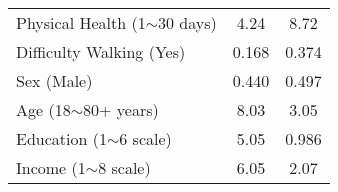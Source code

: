 \documentclass[12pt]{article}
\begin{document}
\begin{table}[!htbp]
\begin{tabular}{l c c}
Physical Health (1$\sim$30 days) & 4.24                & 8.72                        \\
Difficulty Walking (Yes)         & 0.168               & 0.374                       \\
Sex (Male)                       & 0.440               & 0.497                       \\
Age (18$\sim$80+ years)          & 8.03                & 3.05                        \\
Education (1$\sim$6 scale)       & 5.05                & 0.986                       \\
Income (1$\sim$8 scale)          & 6.05                & 2.07                        \\
\bottomrule
\end{tabular}
\end{table}
\end{document}
